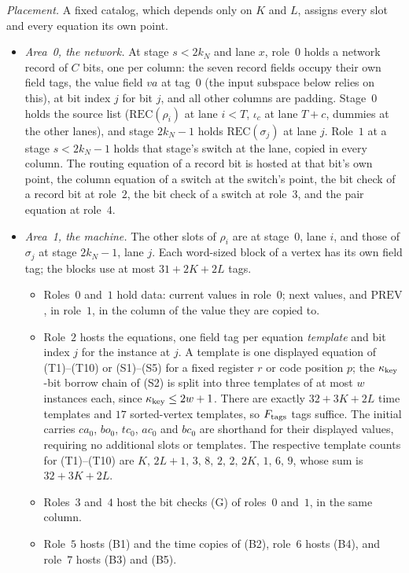 \documentclass[11pt,letterpaper]{article}
\theoremstyle{definition}
\theoremstyle{remark}
\begin{document}
\emph{Placement.} A fixed catalog, which depends only on \(K\) and
\(L\), assigns every slot and every equation its own point.
\begin{itemize}
\item \emph{Area~0, the network.} At stage \(s<2k_N\) and lane \(x\),
role~\(0\) holds a network record of \(C\) bits, one per column: the
seven record fields occupy their own field tags, the value field
\(\mathit{va}\) at tag~\(0\) (the input subspace below relies on this),
at bit index \(j\) for bit \(j\), and all other columns are padding. Stage~\(0\) holds the
source list (\(\mathrm{REC}(\rho_i)\) at lane \(i<T\), \(\iota_c\) at
lane \(T+c\), dummies at the other lanes), and stage \(2k_N-1\) holds
\(\mathrm{REC}(\sigma_j)\) at lane \(j\). Role~\(1\) at a stage
\(s<2k_N-1\) holds that stage's switch at the lane, copied in every
column. The routing equation of a record bit is hosted at that bit's
own point, the column equation of a switch at the switch's point, the
bit check of a record bit at role~\(2\), the bit check of a switch at
role~\(3\), and the pair equation at role~\(4\).
\item \emph{Area~1, the machine.} The other slots of \(\rho_i\) are at
stage~\(0\), lane \(i\), and those of \(\sigma_j\) at stage \(2k_N-1\),
lane \(j\). Each word-sized block of a vertex has its own field tag;
the blocks use at most \(31+2K+2L\) tags.
\begin{itemize}
\item Roles~\(0\) and~\(1\) hold data: current values in role~\(0\);
next values, and \(\mathrm{PREV}\), in role~\(1\), in the column of the
value they are copied to.
\item Role~\(2\) hosts the equations, one field tag per equation
\emph{template} and bit index \(j\) for the instance at \(j\). A template
is one displayed equation of (T1)--(T10) or (S1)--(S5) for a fixed
register \(r\) or code position \(p\); the \(\kappa_{\rm key}\)-bit borrow chain of
(S2) is split into three templates of at most \(w\) instances each,
since \(\kappa_{\rm key}\le2w+1\). There are exactly \(32+3K+2L\) time templates
and \(17\) sorted-vertex templates, so \(F_{\rm tags}\) tags suffice.
The initial carries \(\mathit{ca}_0\), \(\mathit{bo}_0\),
\(\mathit{tc}_0\), \(\mathit{ac}_0\) and \(\mathit{bc}_0\) are
shorthand for their displayed values, requiring no additional slots or
templates. The respective template counts for (T1)--(T10) are
\(K,\,2L+1,\,3,\,8,\,2,\,2,\,2K,\,1,\,6,\,9\), whose sum is
\(32+3K+2L\).
\item Roles~\(3\) and~\(4\) host the bit checks (G) of roles~\(0\)
and~\(1\), in the same column.
\item Role~\(5\) hosts (B1) and the time copies of (B2), role~\(6\)
hosts (B4), and role~\(7\) hosts (B3) and (B5).
\end{itemize}
\end{itemize}
\end{document}
